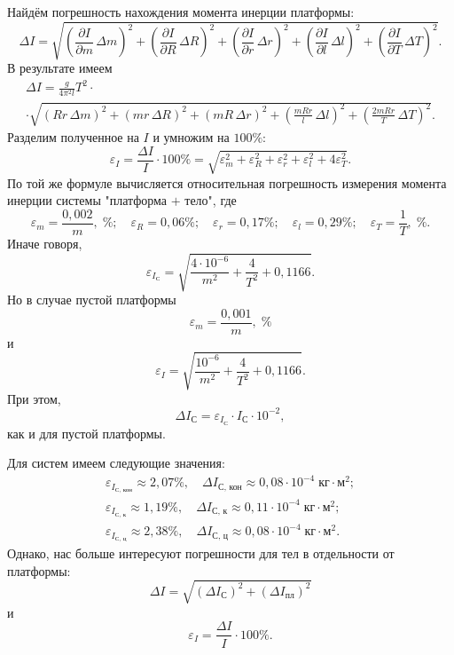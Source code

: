 Найдём погрешность нахождения момента инерции платформы:
\[
\Delta I=\sqrt{\left(\frac{\partial I}{\partial m}\,\Delta m\right)^2+\left(\frac{\partial I}{\partial R}\,\Delta R\right)^2+\left(\frac{\partial I}{\partial r}\,\Delta r\right)^2+\left(\frac{\partial I}{\partial l}\,\Delta l\right)^2+\left(\frac{\partial I}{\partial T}\,\Delta T\right)^2}.
\]
В результате имеем
\begin{multline*}
\Delta I=\frac{g}{4\pi^2l}T^2\cdot \\
\cdot\sqrt{\left(Rr\,\Delta m\right)^2+\left(mr\,\Delta R\right)^2+\left(mR\,\Delta r\right)^2+\left(\frac{mRr}{l}\,\Delta l\right)^2+\left(\frac{2mRr}{T}\,\Delta T\right)^2}.
\end{multline*}
Разделим полученное на $I$ и умножим на $100\%$:
\[
\varepsilon_I=\frac{\Delta I}{I}\cdot100\%=\sqrt{\varepsilon_m^2+\varepsilon_R^2+\varepsilon_r^2+\varepsilon_l^2+4\varepsilon^2_T}.
\]
По той же формуле вычисляется относительная погрешность измерения момента инерции системы "платформа $+$ тело"{}, где
\[
\varepsilon_m=\frac{0{,}002}{m},\;\%;\quad\varepsilon_R=0{,}06\%;\quad\varepsilon_r=0{,}17\%;\quad\varepsilon_l=0{,}29\%;\quad\varepsilon_T=\frac{1}{T},\;\%. 
\]
Иначе говоря,
\[
\varepsilon_{I_\text{С}}=\sqrt{\frac{4\cdot10^{-6}}{m^2}+\frac{4}{T^2}+0{,}1166}.
\]
Но в случае пустой платформы
\[
\varepsilon_m=\frac{0{,}001}{m},\;\%
\]
и
\[
\varepsilon_{I}=\sqrt{\frac{10^{-6}}{m^2}+\frac{4}{T^2}+0{,}1166}.
\]
При этом,
\[
\Delta I_\text{С}=\varepsilon_{I_\text{С}}\cdot I_\text{С}\cdot10^{-2},
\]
как и для пустой платформы. 

Для систем имеем следующие значения:
\begin{gather*}
\varepsilon_{I_\text{С, кон}}\approx2{,}07\%,\quad\Delta I_\text{С, кон}\approx0{,}08\cdot10^{-4}\;\text{кг$\cdot$м$^2$}; \\
\varepsilon_{I_\text{С, к}}\approx1{,}19\%,\quad\Delta I_\text{С, к}\approx0{,}11\cdot10^{-4}\;\text{кг$\cdot$м$^2$}; \\
\varepsilon_{I_\text{С, ц}}\approx2{,}38\%,\quad\Delta I_\text{С, ц}\approx0{,}08\cdot10^{-4}\;\text{кг$\cdot$м$^2$}.
\end{gather*}
Однако, нас больше интересуют погрешности для тел в отдельности от платформы:
\[
\Delta I=\sqrt{(\Delta I_\text{С})^2+(\Delta I_\text{пл})^2}
\]
и
\[
\varepsilon_I=\frac{\Delta I}{I}\cdot 100\%.
\]